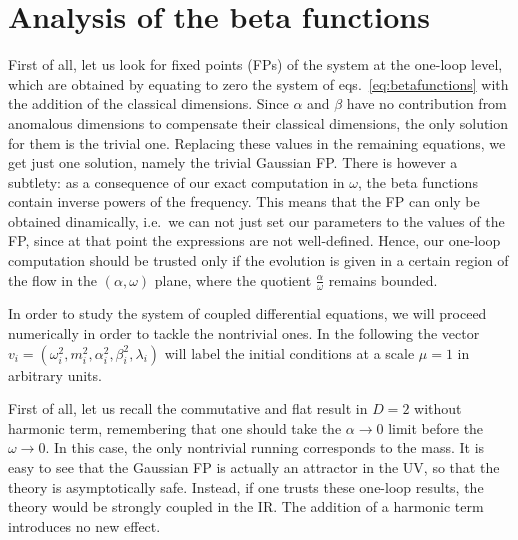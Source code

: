\documentclass[a4paper,10pt]{amsart}
\newcommand{\nocol}[1]{{#1}}
\begin{document}
\iffalse
\begin{align}
\begin{split}\label{eq:betafunctions}
 \beta_{\bar\omega^2}
 &=-\frac{\bar\lambda}{24\pi } \left(9 \bar\alpha ^2+16 \bar\beta ^2 \bar\omega ^2\right)-4\bar\omega^2,\\
 \beta_{\bar m^2}
 &=-\frac{\bar\lambda}{24\pi }  \left( \frac{6 \bar\alpha ^2 \bar m^2}{\bar\omega ^2}+8\bar \beta ^2 \bar m^2+6\right)-2\bar m^2,\\
 \beta_{\bar\lambda}
 &=-2 \frac{\bar\lambda^2  }{4\pi}\left[ \frac{3 \bar\alpha ^2}{\bar\omega ^2}+4 \bar\beta ^2 \right]-2\bar\lambda,
 \\
 \beta_{\bar\beta^2}
 &=2\bar\beta^2,
 \\
 \beta_{\bar\alpha^2}
 &= -2\bar\alpha^2.
 \end{split}
\end{align}
\fi
 \section{Analysis of the beta functions}\label{sec:beta_functions}
First of all, let us look for fixed points (FPs) of the system at the one-loop level, which are obtained by equating \nocol{
to zero the system of eqs.~\eqref{eq:betafunctions} with the addition of the classical dimensions.}
 Since $\alpha$ and $\beta$ have no contribution from anomalous dimensions to compensate their classical dimensions, the only solution for them is the trivial one.
 Replacing these values in the remaining equations, we get just one solution, namely the trivial Gaussian FP.
There is however a subtlety: as a consequence of our exact computation in $\omega$, the beta functions contain inverse powers of the frequency.
 This means that the FP can only be obtained dinamically, i.e.~we can not just set our parameters to the values of the FP, since at that point the expressions are not well-defined.
 Hence, our one-loop computation should be trusted only if the evolution is given in a certain region of the flow in the $(\alpha,\omega)$ plane,
 where the quotient $\frac{\alpha}{\omega}$ remains bounded.


 In order to study the system of coupled differential equations, we will proceed numerically in order to tackle the nontrivial ones.
 In the following the vector $v_i=(\omega^2_i,m_i^2,\alpha^2_i,\beta_i^2,\lambda_i)$ will label the initial conditions at a scale $\mu=1$ in arbitrary units.

 First of all, let us recall the commutative and flat result in $D=2$ without harmonic term,
 remembering that one should take the $\alpha\rightarrow 0$ limit before the $\omega\rightarrow 0$.
 In this case, the only nontrivial running corresponds to the mass.
 It is easy to see that the Gaussian FP is actually an attractor in the UV,
 so that the theory is asymptotically safe.
 Instead, if one trusts these one-loop results, the theory would be strongly coupled in the IR.
 The addition of a harmonic term introduces no new effect.
\end{document}
